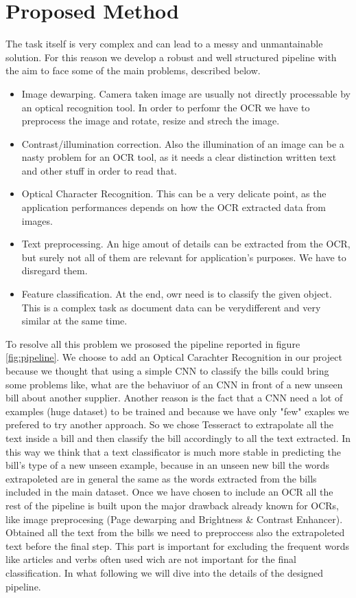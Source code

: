 \documentclass[10pt,twocolumn,letterpaper]{article}
\begin{document}
\section{Proposed Method}
\label{sec:proposed-method}

The task itself is very complex and can lead to a messy and
unmantainable solution. For this reason we develop a robust and well
structured pipeline with the aim to face some of the main problems,
described below.
\begin{itemize}
	\item Image dewarping. Camera taken image are usually not directly
	processable by an optical recognition tool. In order to perfomr
	the OCR we have to preprocess the image and rotate, resize and
	strech the image.
	\item Contrast/illumination correction. Also the illumination of an
	image can be a nasty problem for an OCR tool, as it needs a clear
	distinction written text and other stuff in order to read that.
	\item Optical Character Recognition. This can be a very delicate
	point, as the application performances depends on how the OCR
	extracted data from images.
	\item Text preprocessing. An hige amout of details can be extracted
	from the OCR, but surely not all of them are relevant for
	application's purposes. We have to disregard them.
	\item Feature classification. At the end, owr need is to classify the
	given object. This is a complex task as document data can be verydifferent and very similar at the same time.
\end{itemize}

To resolve all this problem we prososed the pipeline reported in figure \ref{fig:pipeline}. We choose to add an Optical Carachter Recognition in our project because we thought that using a simple CNN to classify the bills could bring some problems like, what are the behaviuor of an CNN in front of a new unseen bill about another supplier. Another reason is the fact that a CNN need a lot of examples (huge dataset) to be trained and because we have only "few" exaples we prefered to try another approach. So we chose Tesseract to extrapolate all the text inside a bill and then classify the bill accordingly to all the text extracted. In this way we think that a text classificator is much more stable in predicting the bill's type of a new unseen example, because in an unseen new bill the words extrapoleted are in general the same as the words extracted from the bills included in the main dataset. Once we have chosen to include an OCR all the rest of the pipeline is built upon the major drawback already known for OCRs, like image preprocesing (Page dewarping and Brightness \& Contrast Enhancer). Obtained all the text from the bills we need to preproccess also the extrapoleted text before the final step. This part is important for excluding the frequent words like articles and verbs often used wich are not important for the final classification. In what following we will dive into the details of the designed pipeline.
\end{document}
